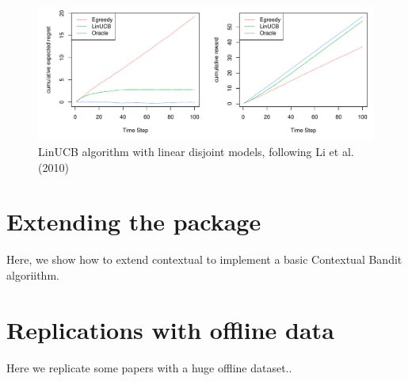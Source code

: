 \documentclass[nojss]{jss}\usepackage[]{graphicx}\usepackage[]{color}
\makeatletter
\def\maxwidth{ %
  \ifdim\Gin@nat@width>\linewidth
    \linewidth
  \else
    \Gin@nat@width
  \fi
}
\newenvironment{knitrout}{}{} %
\makeatother
\begin{document}
\begin{center}
\begin{knitrout}
\color{fgcolor}\begin{figure}[H]
\includegraphics[width=\maxwidth,]{fig/fig3-1} \caption[LinUCB algorithm with linear disjoint models, following Li et al]{LinUCB algorithm with linear disjoint models, following Li et al. (2010)}\label{fig:fig3}
\end{figure}


\end{knitrout}
\end{center}

\section{Extending the package}

Here, we show how to extend contextual to implement a basic Contextual Bandit algoriithm.

\section{Replications with offline data}

Here we replicate some papers with a huge offline dataset..
\end{document}
